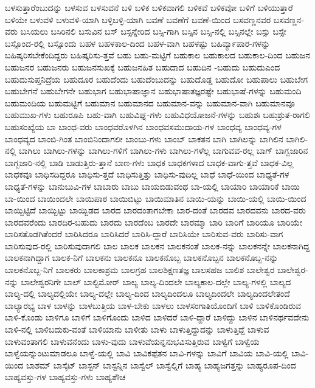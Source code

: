{ಬಳಸುತ್ತಾರೆಂಬುದನ್ನು
ಬಳಸುವ
ಬಳಸುವನೆ
ಬಳಿ
ಬಳಿಕ
ಬಳಿಕವಾಗಲಿ
ಬಳಿಕವೆ
ಬಳಿಕವೋ
ಬಳಿಗೆ
ಬಳಿಯುತ್ತಾರೆ
ಬಳಿಯೇ
ಬಳುವಳಿ
ಬಳುವಳಿ-ಯಾಗಿ
ಬಳ್ಳಿಬಳ್ಳಿ-ಯಾಗಿ
ಬವಣೆ
ಬವಣೆಗೆ
ಬವಣೆ-ಯಿಂದ
ಬಸವಣ್ಣನವರ
ಬಸವಣ್ಣನ-ವರು
ಬಸಿಯಲು
ಬಸಿರಿನಲಿ
ಬಸುವಿನ
ಬಸ್
ಬಸ್ಸನ್ನೇರಿದ
ಬಸ್ಸಿ-ಗಾಗಿ
ಬಸ್ಸಿನ
ಬಸ್ಸಿ-ನಲ್ಲಿ
ಬಸ್ಸಿನಲ್ಲೇ
ಬಸ್ಸು
ಬಸ್ಸೇ
ಬಸ್ಸೊಂದ-ರಲ್ಲಿ
ಬಸ್ಸೊಂದು
ಬಹಳ
ಬಹಳಕಾಲ-ದಿಂದ
ಬಹಳ-ವಾಗಿ
ಬಹಳಷ್ಟು
ಬಹಿರ್ವ್ಯಾಪಾರ-ಗಳನ್ನು
ಬಹಿಷ್ಕರಿಸಬೇಕೆಂದಿದ್ದರು
ಬಹಿಷ್ಕರಿಸು-ತ್ತವೆ
ಬಹು
ಬಹು-ಮಟ್ಟಿಗೆ
ಬಹುಕಾಲ
ಬಹುಕಾಲದ
ಬಹುಕಾಲ-ದಿಂದ
ಬಹುಜನ
ಬಹುಜನರ
ಬಹುಜನರು
ಬಹುಜನಸುಖಕ್ಕೆ
ಬಹುಜನಹಿತ
ಬಹುದಾದ
ಬಹುದಿನ
-ಬಹುದು
ಬಹುದುಎಂದ
ಬಹುದುಸುಪ್ತನಿದ್ರೆಯ
ಬಹುದೂರ
ಬಹುದೆಂದು
ಬಹುದೆಂಬುದನ್ನು
ಬಹುದೊಡ್ಡ
ಬಹುದೋ
ಬಹುಪಾಲು
ಬಹುಬೇಗ
ಬಹುಬೇಗನೆ
ಬಹುಬೇಗನೇ
ಬಹುಭಾಗ
ಬಹುಭಾಷಾಜ್ಞಾನ
ಬಹುಭಾಷಾತಜ್ಞರಷ್ಟೇ
ಬಹುಭಾಷೆ-ಗಳನ್ನು
ಬಹುಮಂದಿ
ಬಹುಮಂದಿಯ
ಬಹುಮಟ್ಟಿಗೆ
ಬಹುಮಾನ
ಬಹುಮಾನದ
ಬಹುಮಾನ-ವನ್ನು
ಬಹುಮಾನ-ವಾಗಿ
ಬಹುಮಾನವೂ
ಬಹುಮುಖ-ಗಳು
ಬಹುರೂಪಿ
ಬಹು-ವಾಗಿ
ಬಹುವಿಘ್ನ-ಗಳು
ಬಹುವಿಧಯೋಜನೆ-ಗಳನ್ನು
ಬಹುಶಃ
ಬಹುಶ್ರುತ-ರಾಗಲಿ
ಬಹುಸಂಖ್ಯೆಯ
ಬಾ
ಬಾಂಧ-ವರು
ಬಾಂಧವರೊಳಗಿನ
ಬಾಂಧವಸಮುದಾಯ-ಗಳ
ಬಾಂಧವ್ಯ
ಬಾಂಧವ್ಯ-ಗಳ
ಬಾಂಧವ್ಯದ
ಬಾಂಬಿ-ಗಿಂತ
ಬಾಂಬಿನಿಂದಾಗಲೀ
ಬಾಂಬು-ಗಳು
ಬಾಂಬ್
ಬಾಕತನ
ಬಾಗಿ
ಬಾಗಿಲನ್ನು
ಬಾಗಿಲಿನ
ಬಾಗಿಲಿ-ನಲ್ಲಿ
ಬಾಗಿಲು
ಬಾಗಿಲು-ಗಳನ್ನು
ಬಾಗಿಲು-ಗಳಿಗೆ
ಬಾಗಿಲು-ಗಳು
ಬಾಗಿಲು-ಗಳೆಲ್ಲ
ಬಾಗುವವ-ರಲ್ಲ
ಬಾಗ್
ಬಾಗ್ಬಜಾರಿನ
ಬಾಗ್ಬಜಾರಿ-ನಲ್ಲಿ
ಬಾಡಿ
ಬಾಡುತ್ತಿರು-ತ್ತಾನೆ
ಬಾಣ-ಗಳು
ಬಾಧಕ
ಬಾಧಕಗಳಾದ
ಬಾಧಕ-ವಾಗು-ತ್ತವೆ
ಬಾಧಕ-ವಿಲ್ಲ
ಬಾಧಕವೂ
ಬಾಧಿಸದಿದ್ದರೂ
ಬಾಧಿಸು-ತ್ತದೆ
ಬಾಧಿಸುತ್ತಿತ್ತು
ಬಾಧಿಸು-ವುದಿಲ್ಲ
ಬಾಧೆ
ಬಾಧೆ-ಯಿಂದ
ಬಾಧ್ಯತೆ-ಗಳ
ಬಾಧ್ಯತೆ-ಗಳನ್ನು
ಬಾನುಬುವಿ-ಗಳ
ಬಾಬಾರು
ಬಾಬು
ಬಾಯಬಿಡುವಂಥ
ಬಾ-ಯಲ್ಲಿ
ಬಾಯಾರಿ
ಬಾಯಾರಿಕೆ
ಬಾಯಿ
ಬಾ-ಯಿಂದ
ಬಾಯಿಂದಲೇ
ಬಾಯಿಪಾಠ
ಬಾಯಿಬಿಟ್ಟು
ಬಾಯಿಮಾತಿನ
ಬಾಯಿ-ಯನ್ನು
ಬಾಯಿ-ಯಲ್ಲಿ
ಬಾಯಿ-ಯಿಂದ
ಬಾಯ್ಬಿಟ್ಟಿದೆ
ಬಾಯ್ಬಿಟ್ಟು
ಬಾಯ್ಬಿಡದ
ಬಾರದ
ಬಾರದಂತಾಗಬೇಕಾ
ಬಾರ-ದಂತೆ
ಬಾರದವ
ಬಾರದವನು
ಬಾರದ-ವರು
ಬಾರದವರೆಂದು
ಬಾರದಿರ-ಬಹುದು
ಬಾರದು
ಬಾರದೆಂಬ
ಬಾರದೇ
ಬಾರಮ್ಮಾ
ಬಾರಿ
ಬಾರಿಗೆ
ಬಾರಿಯೂ
ಬಾರಿಯೇ
ಬಾರಿಸತೊಡಗಿತೆಂದರೆ
ಬಾರಿಸಿದರೂ
ಬಾರಿಸಿದರೆ
ಬಾರಿಸಿ-ದ್ದಾರೆ
ಬಾರಿಸಿಯೇ
ಬಾರಿಸುವ-ವರು
ಬಾರಿಸು-ವಾಗ
ಬಾರಿಸುವುದ-ರಲ್ಲಿ
ಬಾರಿಸುವುದಾಗಲಿ
ಬಾಲ
ಬಾಲಕ
ಬಾಲಕನ
ಬಾಲಕನಂತೆ
ಬಾಲಕ-ನನ್ನು
ಬಾಲಕನನ್ನೇ
ಬಾಲಕನಾಗಿದ್ದ
ಬಾಲಕನಾಗಿದ್ದಾಗ
ಬಾಲಕ-ನಿಗೆ
ಬಾಲಕನು
ಬಾಲಕನೂ
ಬಾಲಕನೊಬ್ಬ
ಬಾಲಕನೊಬ್ಬನ
ಬಾಲಕನೊಬ್ಬ-ನನ್ನು
ಬಾಲಕನೊಬ್ಬ-ನಿಗೆ
ಬಾಲಕರು
ಬಾಲಕಾಶ್ರಮ
ಬಾಲಗ್ರಹ
ಬಾಲಶಿಕ್ಷಣತಜ್ಞ
ಬಾಲಸಹಜ
ಬಾಲಿಶ
ಬಾಲೇಶ್ವರ
ಬಾಲೇಶ್ವರ-ನನ್ನು
ಬಾಲೇಶ್ವರನಿಗೇ
ಬಾಲ್
ಬಾಲ್ಟಿಮೋರ್
ಬಾಲ್ಯ
ಬಾಲ್ಯ-ದಿಂದಲೇ
ಬಾಲ್ಯಕಾಲ-ದಲ್ಲೇ
ಬಾಲ್ಯ-ಗಳಲ್ಲಿ
ಬಾಲ್ಯದ
ಬಾಲ್ಯ-ದಲ್ಲಿ
ಬಾಲ್ಯದಲ್ಲಿಯೇ
ಬಾಲ್ಯ-ದಲ್ಲೇ
ಬಾಲ್ಯ-ದಿಂದ
ಬಾಲ್ಯದಿಂದಲೂ
ಬಾಲ್ಯದಿಂದಲೇ
ಬಾಲ್ಯದಿಂದಲೇತಂದೆ
ಬಾಲ್ಯಾರಭ್ಯ
ಬಾಳ
ಬಾಳನ್ನು
ಬಾಳಬುತ್ತಿಯ
ಬಾಳ-ಬೇಕು
ಬಾಳಲು
ಬಾಳಸಂಗಾತಿಯೊಂದಿಗೆ
ಬಾಳಿ
ಬಾಳಿಕೊಂಡಿರುವ
ಬಾಳಿ-ಕೊಂಡು
ಬಾಳಿಗೂ
ಬಾಳಿಗೆ
ಬಾಳಿಗೊಂದು
ಬಾಳಿದ
ಬಾಳಿದರೆ
ಬಾಳಿ-ದ್ದಾರೆ
ಬಾಳಿದ್ದು
ಬಾಳಿನ
ಬಾಳಿನರ್ಥವದೇನು
ಬಾಳಿ-ನಲ್ಲಿ
ಬಾಳಿಬದುಕು-ವಂತೆ
ಬಾಳಿಯಾನು
ಬಾಳೀತು
ಬಾಳು
ಬಾಳುತ್ತಿದ್ದುದನ್ನು
ಬಾಳುತ್ತಿದ್ದೆ
ಬಾಳುವ
ಬಾಳುವಂತಾಗಲಿ
ಬಾಳುವನೆಂದು
ಬಾಳು-ವುದು
ಬಾಳುವೆಯನ್ನನುಭವಿಸುತ್ತಿರುವ
ಬಾಳ್ವೆಗೆ
ಬಾಳ್ವೆಯ
ಬಾಳ್ವೆಯನ್ನುಂಟುಮಾಡಲೂ
ಬಾಳ್ವೆ-ಯಲ್ಲಿ
ಬಾವಿ
ಬಾವಿಕಪ್ಪೆತನ
ಬಾವಿ-ಗಳನ್ನು
ಬಾವಿಗೆ
ಬಾವಿಯ
ಬಾವಿ-ಯಲ್ಲಿ
ಬಾವಿ-ಯಿಂದ
ಬಾಶಮ್
ಬಾಸ್ಕೆಟ್
ಬಾಸ್ಟನ್
ಬಾಸ್ಟನ್ನಿನ
ಬಾಸ್ವೆಲ್
ಬಾಸ್ವೆಲ್ನಿಗೆ
ಬಾಹ್ಯ
ಬಾಹ್ಯಜಗತ್ತನ್ನು
ಬಾಹ್ಯರೂಪ-ದಿಂದ
ಬಾಹ್ಯವಸ್ತು-ಗಳ
ಬಾಹ್ಯವಸ್ತು-ಗಳು
ಬಾಹ್ಯಶೌಚ
}
